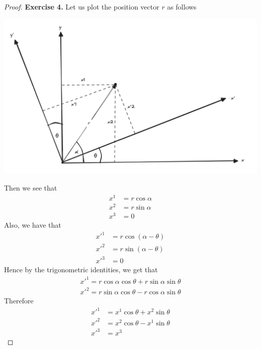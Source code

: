 \documentclass[11pt]{article}
\theoremstyle{definition}
\begin{document}
\begin{proof}{\textbf{Exercise 4.}}
    Let us plot the position vector $r$ as follows
    \begin{center}
        \includegraphics[scale=0.3]{ch1-4.png}
    \end{center}
    Then we see that
    \begin{align*}
        x^1 &= r\cos\alpha\\
        x^2 &= r\sin\alpha\\
        x^3 &= 0
    \end{align*}
    Also, we have that
    \begin{align*}
        x'^1 &= r\cos(\alpha - \theta)\\
        x'^2 &= r\sin(\alpha - \theta)\\
        x'^3 &= 0
    \end{align*}
    Hence by the trigonometric identities, we get that
    \begin{align*}
        x'^1 = r\cos\alpha\cos\theta + r\sin\alpha\sin\theta\\
        x'^2 = r\sin\alpha\cos\theta - r\cos\alpha\sin\theta
    \end{align*}
    Therefore
    \begin{align*}
        x'^1 &= x^1\cos\theta + x^2\sin\theta\\
        x'^2 &= x^2\cos\theta - x^1\sin\theta\\
        x'^3 &= x^3
    \end{align*}
\end{proof}
\cleardoublepage
\end{document}
